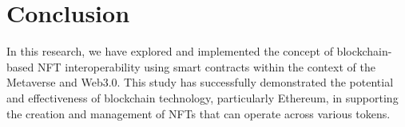 \section{Conclusion}
\label{sec:kesimpulan}

In this research, we have explored and implemented the concept of blockchain-based NFT interoperability using smart contracts within the context of the Metaverse and Web3.0. This study has successfully demonstrated the potential and effectiveness of blockchain technology, particularly Ethereum, in supporting the creation and management of NFTs that can operate across various tokens.


